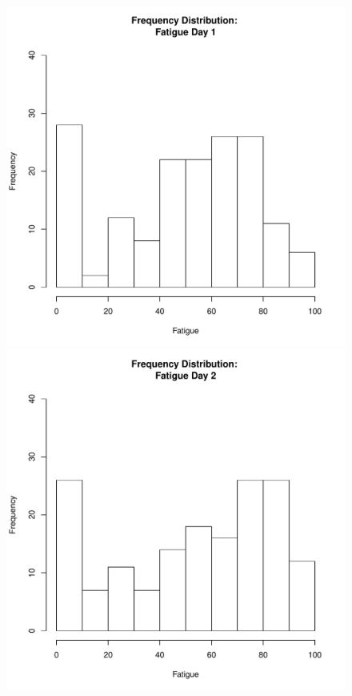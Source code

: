 \documentclass[12pt]{report}
\begin{document}
{%
\begin{figure}[htbp]
  \includegraphics[scale =.4]{../images/distFatigueDay1.pdf}
  \includegraphics[scale =.4]{../images/distFatigueDay2.pdf}

\end{figure}}
\end{document}
